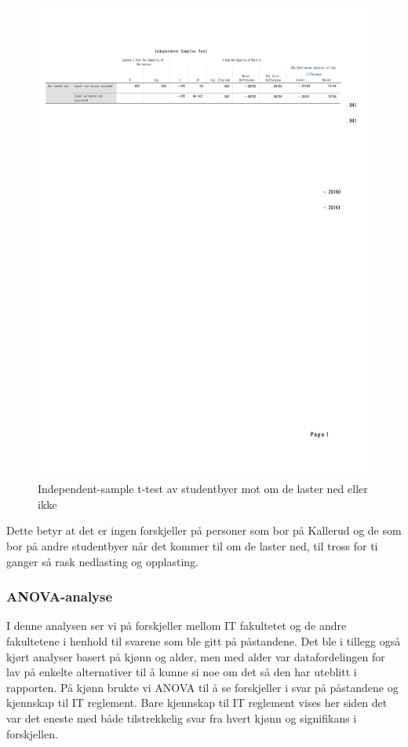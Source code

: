 \begin{figure}[H]
    \centering
    \includegraphics[scale=0.7]{case_1/bilder/studentby_lasterned_ttest.pdf}
    \caption[T-test av studentbyer mot om de laster ned eller ikke]{Independent-sample t-test av studentbyer mot om de laster ned eller ikke}
    \label{fig:case1-studby_lasterned_ttest}
\end{figure}

Dette betyr at det er ingen forskjeller på personer som bor på Kallerud og de som bor på andre studentbyer når det kommer til om de laster ned, til tross for ti ganger så rask nedlasting og opplasting. 

\subsubsection{ANOVA-analyse}
I denne analysen ser vi på forskjeller mellom IT fakultetet og de andre fakultetene i henhold til svarene som ble gitt på påstandene. Det ble i tillegg også kjørt analyser basert på kjønn og alder, men med alder var datafordelingen for lav på enkelte alternativer til å kunne si noe om det så den har uteblitt i rapporten. På kjønn brukte vi ANOVA til å se forskjeller i svar på påstandene og kjennskap til IT reglement. Bare kjennskap til IT reglement vises her siden det var det eneste med både tilstrekkelig svar fra hvert kjønn og signifikans i forskjellen.

